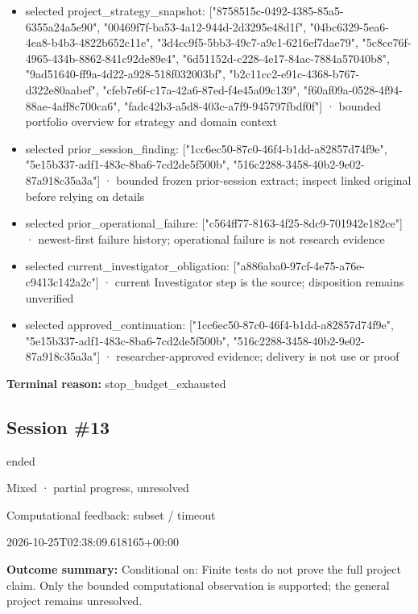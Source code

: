\documentclass[11pt]{article}
\begin{document}
\begin{itemize}
\item selected project\_strategy\_snapshot: ["8758515c-0492-4385-85a5-6355a24a5e90", "00469f7f-ba53-4a12-944d-2d3295e48d1f", "04bc6329-5ea6-4ea8-b4b3-4822b652c11e", "3d4cc9f5-5bb3-49c7-a9c1-6216ef7dae79", "5c8ce76f-4965-434b-8862-841c92de89e4", "6d51152d-c228-4e17-84ac-7884a57040b8", "9ad51640-ff9a-4d22-a928-518f032003bf", "b2c11cc2-e91c-4368-b767-d322e80aabef", "cfeb7e6f-c17a-42a6-87ed-f4e45a09c139", "f60af09a-0528-4f94-88ae-4aff8c700ca6", "fadc42b3-a5d8-403c-a7f9-945797fbdf0f"] · bounded portfolio overview for strategy and domain context
\item selected prior\_session\_finding: ["1cc6ec50-87c0-46f4-b1dd-a82857d74f9e", "5e15b337-adf1-483c-8ba6-7cd2de5f500b", "516c2288-3458-40b2-9e02-87a918c35a3a"] · bounded frozen prior-session extract; inspect linked original before relying on details
\item selected prior\_operational\_failure: ["c564ff77-8163-4f25-8dc9-701942e182ce"] · newest-first failure history; operational failure is not research evidence
\item selected current\_investigator\_obligation: ["a886aba0-97cf-4e75-a76e-c9413c142a2c"] · current Investigator step is the source; disposition remains unverified
\item selected approved\_continuation: ["1cc6ec50-87c0-46f4-b1dd-a82857d74f9e", "5e15b337-adf1-483c-8ba6-7cd2de5f500b", "516c2288-3458-40b2-9e02-87a918c35a3a"] · researcher-approved evidence; delivery is not use or proof
\end{itemize}
\textbf{Terminal reason:} stop\_budget\_exhausted\par
\subsection{Session \#13}
\begin{description}[style=nextline,font=\normalfont\bfseries,leftmargin=0pt,labelsep=0pt]
\item[Execution status] ended
\item[Outcome] Mixed · partial progress, unresolved
\item[Strategy] Computational feedback: subset / timeout
\item[Started] 2026-10-25T02:38:09.618165+00:00
\end{description}
\textbf{Outcome summary:} Conditional on: Finite tests do not prove the full project claim. Only the bounded computational observation is supported; the general project remains unresolved.\par
\end{document}
